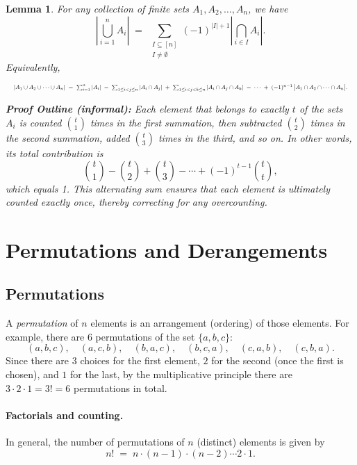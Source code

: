 \documentclass{article}
\newtheorem{lemma}{Lemma}
\begin{document}
\begin{lemma}
\label{lem:PIE}
For any collection of finite sets \(A_1, A_2, \ldots, A_n\), we have
\[
\left|\bigcup_{i=1}^{n} A_i\right|
\;=\;
\sum_{\substack{I \subseteq [n] \\ I \neq \emptyset}}
(-1)^{\lvert I\rvert + 1}
\left|\bigcap_{i \in I} A_i\right|.
\]
Equivalently,

\[
\resizebox{\textwidth}{!}{$
|A_1 \cup A_2 \cup \cdots \cup A_n|
\;=\;
\sum_{i=1}^n |A_i|
\;-\;
\sum_{1 \le i < j \le n} |A_i \cap A_j|
\;+\;
\sum_{1 \le i < j < k \le n} |A_i \cap A_j \cap A_k|
\;-\;\cdots\;
+\;
(-1)^{n-1}\,\bigl|A_1 \cap A_2 \cap \cdots \cap A_n\bigr|.
$}
\]


\noindent \textbf{Proof Outline (informal):} Each element that belongs to exactly \(t\) of the sets \(A_i\) is counted \(\binom{t}{1}\) times in the first summation, then subtracted \(\binom{t}{2}\) times in the second summation, added \(\binom{t}{3}\) times in the third, and so on. In other words, its total contribution is
\[
\binom{t}{1} - \binom{t}{2} + \binom{t}{3} - \cdots + (-1)^{t-1}\binom{t}{t},
\]
which equals 1. This alternating sum ensures that each element is ultimately counted exactly once, thereby correcting for any overcounting.

\end{lemma}

\section{Permutations and Derangements}

\subsection{Permutations}
A \emph{permutation} of $n$ elements is an arrangement (ordering) of those elements.
For example, there are $6$ permutations of the set $\{a,b,c\}$:
\[
(a,b,c), \quad (a,c,b), \quad (b,a,c), \quad (b,c,a), \quad (c,a,b), \quad (c,b,a).
\]
Since there are $3$ choices for the first element, $2$ for the second (once the first is chosen), and $1$ for the last, by the multiplicative principle there are $3 \cdot 2 \cdot 1 = 3! = 6$ permutations in total.

\paragraph{Factorials and counting.}
In general, the number of permutations of $n$ (distinct) elements is given by
\[
n! \;=\; n \cdot (n-1) \cdot (n-2) \cdots 2 \cdot 1.
\]
\end{document}
